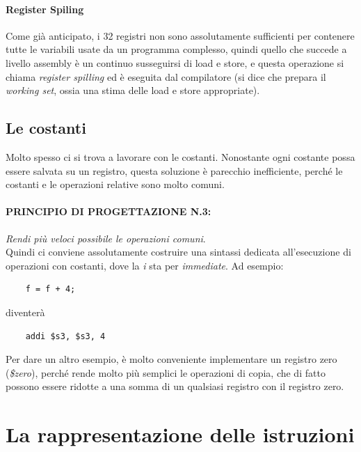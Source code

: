 \documentclass[class=book, crop=false]{standalone}
\begin{document}
\paragraph{Register Spiling}
Come già anticipato, i 32 registri non sono assolutamente sufficienti per contenere tutte le variabili usate da un programma complesso, quindi quello che succede a livello assembly è un continuo susseguirsi di load e store, e questa operazione si chiama \emph{register spilling} ed è eseguita dal compilatore (si dice che  prepara il \emph{working set}, ossia una stima delle load e store appropriate).

\subsection{Le costanti}
Molto spesso ci si trova a lavorare con le costanti. Nonostante ogni costante possa essere salvata su un registro, questa soluzione è parecchio inefficiente, perché le costanti e le operazioni relative sono molto comuni.

\paragraph{PRINCIPIO DI PROGETTAZIONE N.3:}
\emph{Rendi più veloci possibile le operazioni comuni}.\\

Quindi ci conviene assolutamente costruire una sintassi dedicata all'esecuzione di operazioni con costanti, dove la \emph{i} sta per \emph{immediate}. Ad esempio:
\begin{verbatim}
	f = f + 4;
\end{verbatim}
diventerà
\begin{verbatim}
	addi $s3, $s3, 4
\end{verbatim}

Per dare un altro esempio, è molto conveniente implementare un registro zero (\emph{\$zero}), perché rende molto più semplici le operazioni di copia, che di fatto possono essere ridotte a una somma di un qualsiasi registro con il registro zero.

\section{La rappresentazione delle istruzioni}
\end{document}
